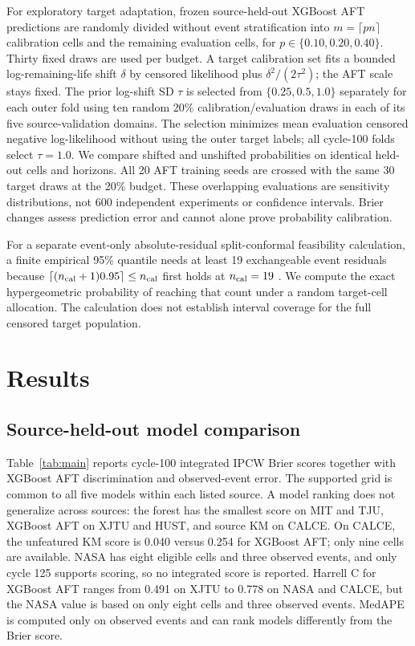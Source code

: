 \documentclass[preprint,12pt]{elsarticle}
\begin{document}
For exploratory target adaptation, frozen source-held-out XGBoost AFT predictions are randomly divided without event stratification into $m=\lceil pn\rceil$ calibration cells and the remaining evaluation cells, for $p\in\{0.10,0.20,0.40\}$. Thirty fixed draws are used per budget. A target calibration set fits a bounded log-remaining-life shift $\delta$ by censored likelihood plus $\delta^2/(2\tau^2)$; the AFT scale stays fixed. The prior log-shift SD $\tau$ is selected from $\{0.25,0.5,1.0\}$ separately for each outer fold using ten random 20\% calibration/evaluation draws in each of its five source-validation domains. The selection minimizes mean evaluation censored negative log-likelihood without using the outer target labels; all cycle-100 folds select $\tau=1.0$. We compare shifted and unshifted probabilities on identical held-out cells and horizons. All 20 AFT training seeds are crossed with the same 30 target draws at the 20\% budget. These overlapping evaluations are sensitivity distributions, not 600 independent experiments or confidence intervals. Brier changes assess prediction error and cannot alone prove probability calibration.

For a separate event-only absolute-residual split-conformal feasibility calculation, a finite empirical 95\% quantile needs at least 19 exchangeable event residuals because $\lceil(n_{\rm cal}+1)0.95\rceil\leq n_{\rm cal}$ first holds at $n_{\rm cal}=19$ \citep{angelopoulos2021}. We compute the exact hypergeometric probability of reaching that count under a random target-cell allocation. The calculation does not establish interval coverage for the full censored target population.

\section{Results}
\subsection{Source-held-out model comparison}
Table~\ref{tab:main} reports cycle-100 integrated IPCW Brier scores together with XGBoost AFT discrimination and observed-event error. The supported grid is common to all five models within each listed source. A model ranking does not generalize across sources: the forest has the smallest score on MIT and TJU, XGBoost AFT on XJTU and HUST, and source KM on CALCE. On CALCE, the unfeatured KM score is 0.040 versus 0.254 for XGBoost AFT; only nine cells are available. NASA has eight eligible cells and three observed events, and only cycle 125 supports scoring, so no integrated score is reported. Harrell C for XGBoost AFT ranges from 0.491 on XJTU to 0.778 on NASA and CALCE, but the NASA value is based on only eight cells and three observed events. MedAPE is computed only on observed events and can rank models differently from the Brier score.
\end{document}
